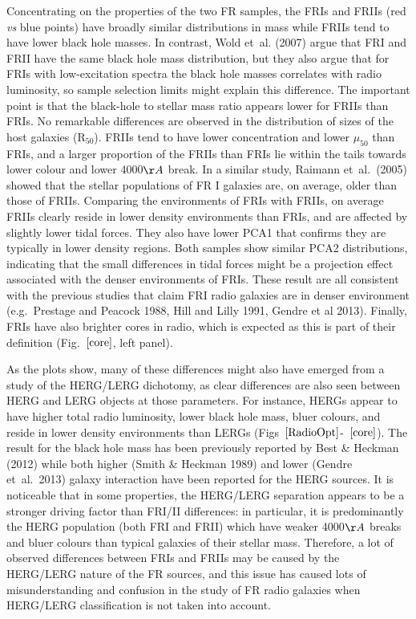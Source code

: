 \documentclass[usenatbib]{mn2e}
\begin{document}
Concentrating on the properties of the two FR samples, the FRIs and FRIIs (red {\it vs} blue points)
have broadly similar distributions in mass while FRIIs tend to have lower
black hole masses. In contrast, Wold et~al. (2007) argue that FRI and FRII
have the same black hole mass distribution, but they also argue that for
FRIs with low-excitation spectra the black hole masses correlates with
radio luminosity, so sample selection limits might explain this difference. The
important point is that the black-hole to stellar mass ratio appears lower
for FRIIs than FRIs. No remarkable differences are observed in the
distribution of sizes of the host galaxies (R$_{50}$).  FRIIs tend to have
lower concentration and lower $\mu_{50}$ than FRIs, and a larger
proportion of the FRIIs than FRIs lie within the tails towards lower
colour and lower 4000$\AA$ break. In a similar study, Raimann
et~al.\ (2005) showed that the stellar populations of FR I galaxies are,
on average, older than those of FRIIs. Comparing the environments of FRIs
with FRIIs, on average FRIIs clearly reside in lower density environments
than FRIs, and are affected by slightly lower tidal forces. They also have
lower PCA1 that confirms they are typically in lower density regions. Both
samples show similar PCA2 distributions, indicating that the small
differences in tidal forces might be a projection effect associated with
the denser environments of FRIs. These result are all consistent with the
previous studies that claim FRI radio galaxies are in denser environment
(e.g.\ Prestage and Peacock 1988, Hill and Lilly 1991, Gendre et al 2013).
Finally, FRIs have also brighter cores in radio, which is expected as this
is part of their definition (Fig.~$\ref{core}$, left panel).

As the plots show, many of these differences might also have emerged from
a study of the HERG/LERG dichotomy, as clear differences are also seen
between HERG and LERG objects at those parameters. For instance, HERGs
appear to have higher total radio luminosity, lower black hole mass, bluer
colours, and reside in lower density environments than LERGs (Figs~$\ref{RadioOpt}$-~$\ref{core}$).
The result for the black hole mass has been previously reported by Best
\& Heckman (2012) while both higher (Smith \& Heckman 1989) and lower
(Gendre et~al.\ 2013) galaxy interaction have been reported for the HERG
sources. It is noticeable that in some properties, the HERG/LERG
separation appears to be a stronger driving factor than FRI/II
differences: in particular, it is predominantly the HERG population (both
FRI and FRII) which have weaker 4000$\AA$ breaks and bluer colours than
typical galaxies of their stellar mass. Therefore, a lot of observed
differences between FRIs and FRIIs may be caused by the HERG/LERG nature of the FR sources, and this
issue has caused lots of misunderstanding and confusion in the study of FR
radio galaxies when HERG/LERG classification is not taken into account.
\end{document}
